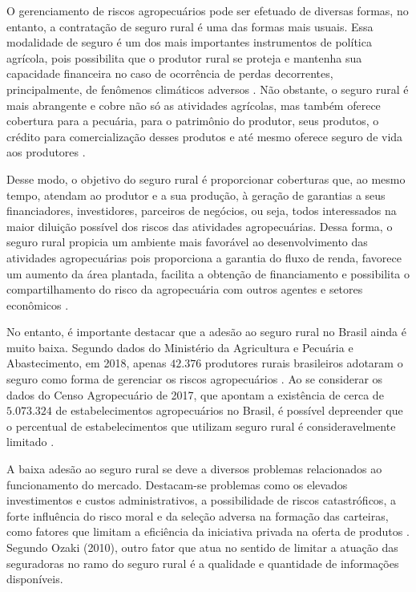 \documentclass[12pt,a4paper]{article}
\begin{document}
O gerenciamento de riscos agropecuários pode ser efetuado de diversas formas, no entanto, a contratação de seguro rural é uma das formas mais usuais. Essa modalidade de seguro é um dos mais importantes instrumentos de política agrícola, pois possibilita que o produtor rural se proteja e mantenha sua capacidade financeira no caso de ocorrência de perdas decorrentes, principalmente, de fenômenos climáticos adversos \cite{susep21_g}. Não obstante, o seguro rural é mais abrangente e cobre não só as atividades agrícolas, mas também oferece cobertura para a pecuária, para o patrimônio do produtor, seus produtos, o crédito para comercialização desses produtos e até mesmo oferece seguro de vida aos produtores \cite{cnsp16_g}. 

Desse modo, o objetivo do seguro rural é proporcionar coberturas que, ao mesmo tempo, atendam ao produtor e a sua produção, à geração de garantias a seus financiadores, investidores, parceiros de negócios, ou seja, todos interessados na maior diluição possível dos riscos das atividades agropecuárias. Dessa forma, o seguro rural propicia um ambiente mais favorável ao desenvolvimento das atividades agropecuárias pois proporciona a garantia do fluxo de renda, favorece um aumento da área plantada, facilita a obtenção de financiamento e possibilita o compartilhamento do risco da agropecuária com outros agentes e setores econômicos \cite{susep21_g}. 

No entanto, é importante destacar que a adesão ao seguro rural no Brasil ainda é muito baixa. Segundo dados do Ministério da Agricultura e Pecuária e Abastecimento, em 2018, apenas $42.376$ produtores rurais brasileiros adotaram o seguro como forma de gerenciar os riscos agropecuários \cite{brasil21}. Ao se considerar os dados do Censo Agropecuário de 2017, que apontam a existência de cerca de  $5.073.324$ de estabelecimentos  agropecuários no Brasil, é possível depreender que o percentual de estabelecimentos que utilizam seguro rural é consideravelmente limitado \cite{ibge19}.

A baixa adesão ao seguro rural se deve a diversos problemas relacionados ao funcionamento do mercado. Destacam-se problemas como os elevados investimentos e custos administrativos, a possibilidade de riscos catastróficos, a forte influência do risco moral e da seleção adversa na formação das carteiras, como fatores que limitam a eficiência da iniciativa privada na oferta de produtos \cite{brasil19b}. Segundo Ozaki (2010), outro fator que atua no sentido de limitar a atuação das seguradoras no ramo do seguro rural é a qualidade e quantidade de informações disponíveis. 
\end{document}

